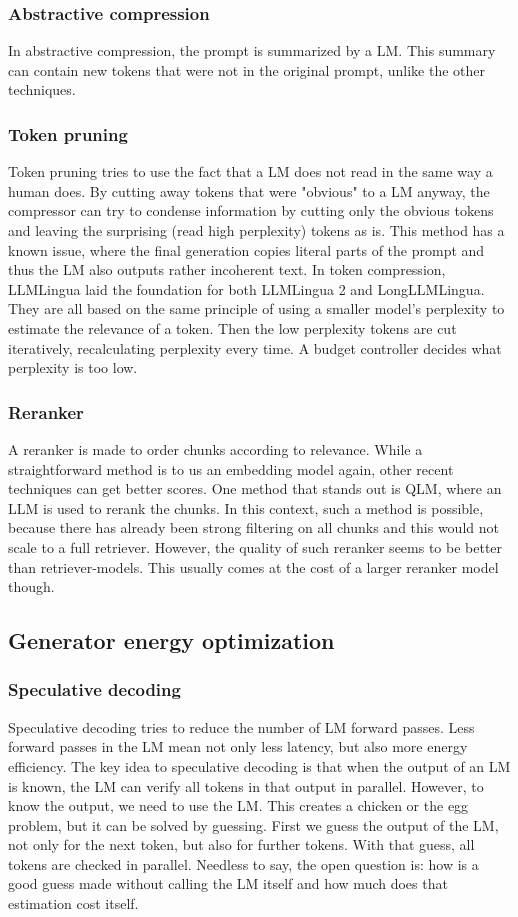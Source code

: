 \subsubsection{Abstractive compression}
In abstractive compression, the prompt is summarized by a LM. This summary can contain new tokens that were not in the original prompt, unlike the other techniques.
\subsubsection{Token pruning}
Token pruning tries to use the fact that a LM does not read in the same way a human does. By cutting away tokens that were "obvious" to a LM anyway, the compressor can try to condense information by cutting only the obvious tokens and leaving the surprising (read high perplexity) tokens as is. This method has a known issue, where the final generation copies literal parts of the prompt and thus the LM also outputs rather incoherent text. In token compression, LLMLingua laid the foundation for both LLMLingua 2 and LongLLMLingua. They are all based on the same principle of using a smaller model's perplexity to estimate the relevance of a token. Then the low perplexity tokens are cut iteratively, recalculating perplexity every time. A budget controller decides what perplexity is too low.

\subsubsection{Reranker}
A reranker is made to order chunks according to relevance. While a straightforward method is to us an embedding model again, other recent techniques can get better scores. One method that stands out is QLM, where an LLM is used to rerank the chunks. In this context, such a method is possible, because there has already been strong filtering on all chunks and this would not scale to a full retriever. However, the quality of such reranker seems to be better than retriever-models. This usually comes at the cost of a larger reranker model though.


\subsection{Generator energy optimization}
\subsubsection{Speculative decoding}
Speculative decoding tries to reduce the number of LM forward passes. Less forward passes in the LM mean not only less latency, but also more energy efficiency. The key idea to speculative decoding is that when the output of an LM is known, the LM can verify all tokens in that output in parallel. However, to know the output, we need to use the LM. This creates a chicken or the egg problem, but it can be solved by guessing. First we guess the output of the LM, not only for the next token, but also for further tokens. With that guess, all tokens are checked in parallel. Needless to say, the open question is: how is a good guess made without calling the LM itself and how much does that estimation cost itself.

